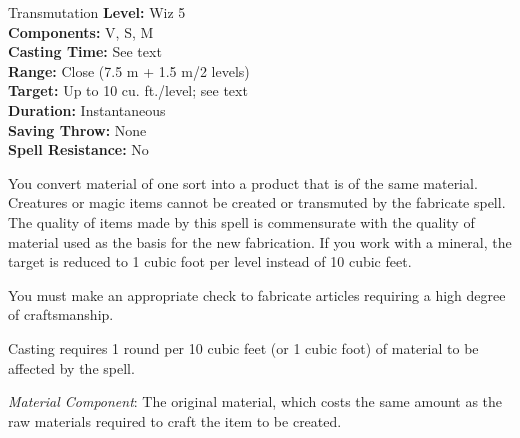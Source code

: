 {Transmutation}
{
	\textbf{Level:}
	Wiz 5\\
	\textbf{Components:}
	V, S, M\\
	\textbf{Casting Time:}
	See text\\
	\textbf{Range:}
	Close (7.5 m + 1.5 m/2 levels)\\
	\textbf{Target:}
	Up to 10 cu. ft./level; see text\\
	\textbf{Duration:}
	Instantaneous\\
	\textbf{Saving Throw:}
	None\\
	\textbf{Spell Resistance:}
	No\\
}
{
	You convert material of one sort into a product that is of the same material. Creatures or magic items cannot be created or transmuted by the fabricate spell. The quality of items made by this spell is commensurate with the quality of material used as the basis for the new fabrication. If you work with a mineral, the target is reduced to 1 cubic foot per level instead of 10 cubic feet.

	You must make an appropriate  check to fabricate articles requiring a high degree of craftsmanship.

	Casting requires 1 round per 10 cubic feet (or 1 cubic foot) of material to be affected by the spell.

	\textit{Material Component}:
	The original material, which costs the same amount as the raw materials required to craft the item to be created.

}

